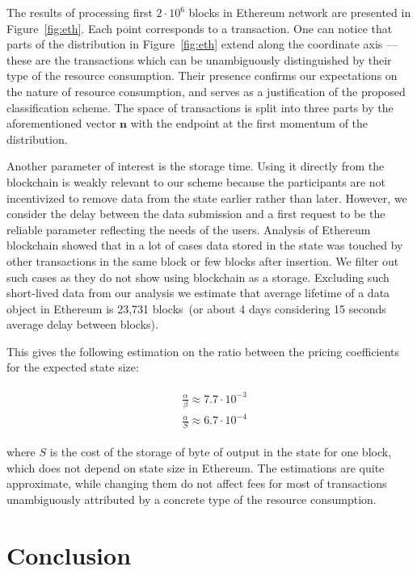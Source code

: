 \documentclass[]{llncs}   %
\newcommand{\authnote}[2]{\marginpar{\parbox{\marginparwidth}{\tiny %
  \textsf{#1 {\textcolor{blue}{notes: #2}}}}}%
  \textcolor{blue}{\textbf{\dag}}}
\newcommand{\authnote}[2]{
  \textsf{#1\textcolor{blue}{ #2}}}
\newcommand{\authnote}[2]{}
\newcommand{\dnote}[1]{{\authnote{\textcolor{red}{Dima notes:}}{#1}}}
\begin{document}
The results of processing first $2\cdot10^6$ blocks in Ethereum network are presented in Figure~\ref{fig:eth}. Each point corresponds to a transaction.  One can notice that parts of the distribution in Figure~\ref{fig:eth} extend
along the coordinate axis --- these are the transactions which can be
unambiguously distinguished by their type of the resource consumption. Their
presence confirms our expectations on the nature of resource consumption, and
serves as a justification of the proposed classification scheme. The space of
transactions is split into three parts by the aforementioned vector $\mathbf{n}$
with the endpoint at the first momentum of the distribution. \dnote{for transactions that are not on axises. How to write it?}

Another parameter of interest is the storage time. Using it directly
from the blockchain is weakly relevant to our scheme because the participants are not incentivized to remove data from the state earlier rather than later.
However, we consider the delay between the data submission and a first request to be the reliable parameter reflecting the needs of the users.
Analysis of Ethereum blockchain showed that in a lot of cases data stored in the state
was touched by other transactions in the same block or few blocks after insertion.
We filter out such cases as they do not show using blockchain as a storage. Excluding such short-lived data from our analysis
we estimate that average lifetime of a data object in Ethereum is 23,731 blocks~(or about 4 days
considering 15 seconds average delay between blocks).

This gives the following estimation on the ratio between the pricing coefficients for the expected state size:

\begin{align}
\begin{split}
&\frac{\alpha}{\beta} \approx 7.7\cdot10^{-3} \\
&\frac{\alpha}{S} \approx 6.7\cdot10^{-4}
\end{split}
\end{align}

where $S$ is the cost of the storage of byte of output in the state for one block, which does
not depend on state size in Ethereum. The estimations are quite approximate, while changing
them do not affect fees for most of transactions unambiguously attributed by a concrete type of the resource consumption.

\section{Conclusion}
\label{sec:conslusion}
\end{document}
